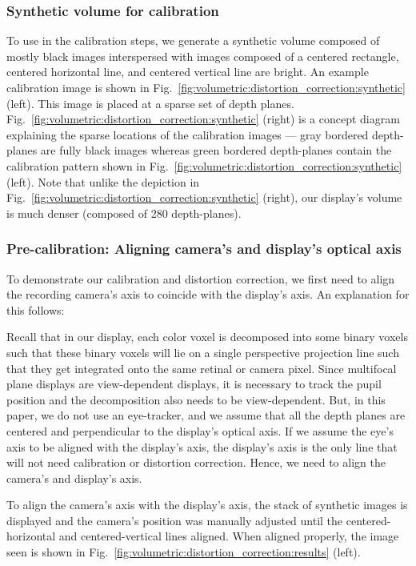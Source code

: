 \subsubsection{Synthetic volume for calibration}
To use in the calibration steps, we generate a synthetic volume composed of mostly black images interspersed with images composed of a centered rectangle, centered horizontal line, and centered vertical line are bright.
An example calibration image is shown in Fig.~\ref{fig:volumetric:distortion_correction:synthetic} (left). This image is placed at a sparse set of depth planes. Fig.~\ref{fig:volumetric:distortion_correction:synthetic} (right) is a concept diagram explaining the sparse locations of the calibration images --- gray bordered depth-planes are fully black images whereas green bordered depth-planes contain the calibration pattern shown in Fig.~\ref{fig:volumetric:distortion_correction:synthetic} (left). Note that unlike the depiction in Fig.~\ref{fig:volumetric:distortion_correction:synthetic} (right), our display's volume is much denser (composed of 280 depth-planes). 

\subsubsection{Pre-calibration: Aligning camera's and display's optical axis}
To demonstrate our calibration and distortion correction, we first need to align the recording camera's axis to coincide with the display's axis. An explanation for this follows:

Recall that in our display, each color voxel is decomposed into some binary voxels such that these binary voxels will lie on a single perspective projection line such that they get integrated onto the same retinal or camera pixel. 
Since multifocal plane displays are view-dependent displays, it is necessary to track the pupil position and the decomposition also needs to be view-dependent.
But, in this paper, we do not use an eye-tracker, and we assume that all the depth planes are centered and perpendicular to the display's optical axis.
If we assume the eye's axis to be aligned with the display's axis, the display's axis is the only line that will not need calibration or distortion correction. Hence, we need to align the camera's and display's axis.

To align the camera's axis with the display's axis, the stack of synthetic images is displayed and the camera's position was manually adjusted until the centered-horizontal and centered-vertical lines aligned. When aligned properly, the image seen is shown in Fig.~\ref{fig:volumetric:distortion_correction:results} (left).

